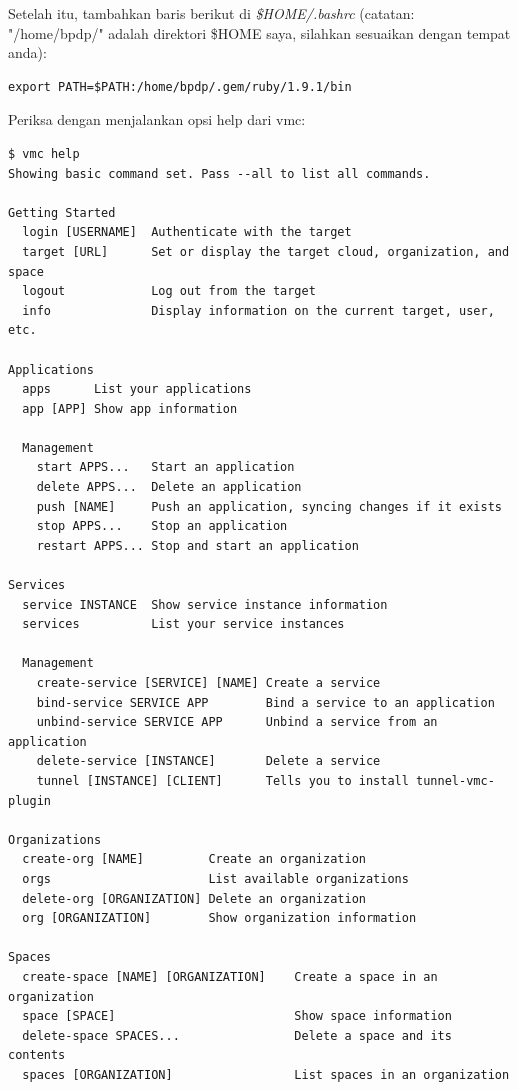 Setelah itu, tambahkan baris berikut di \textit{\$HOME/.bashrc} (catatan: "/home/bpdp/" adalah direktori \$HOME saya, silahkan sesuaikan dengan tempat anda):

\lstset{language=bash,caption=Mengaktifkan direktori "bin" hasil instalasi gem}
\begin{lstlisting}
export PATH=$PATH:/home/bpdp/.gem/ruby/1.9.1/bin
\end{lstlisting}

Periksa dengan menjalankan opsi help dari vmc:

\lstset{language=bash,caption=Hasil opsi help dari vmc}
\begin{lstlisting}
$ vmc help 
Showing basic command set. Pass --all to list all commands.

Getting Started
  login [USERNAME]	Authenticate with the target
  target [URL]    	Set or display the target cloud, organization, and space
  logout          	Log out from the target
  info            	Display information on the current target, user, etc.

Applications
  apps     	List your applications
  app [APP]	Show app information

  Management
    start APPS...  	Start an application
    delete APPS... 	Delete an application
    push [NAME]    	Push an application, syncing changes if it exists
    stop APPS...   	Stop an application
    restart APPS...	Stop and start an application

Services
  service INSTANCE	Show service instance information
  services        	List your service instances

  Management
    create-service [SERVICE] [NAME]	Create a service
    bind-service SERVICE APP       	Bind a service to an application
    unbind-service SERVICE APP     	Unbind a service from an application
    delete-service [INSTANCE]      	Delete a service
    tunnel [INSTANCE] [CLIENT]     	Tells you to install tunnel-vmc-plugin

Organizations
  create-org [NAME]        	Create an organization
  orgs                     	List available organizations
  delete-org [ORGANIZATION]	Delete an organization
  org [ORGANIZATION]       	Show organization information

Spaces
  create-space [NAME] [ORGANIZATION]	Create a space in an organization
  space [SPACE]                     	Show space information
  delete-space SPACES...            	Delete a space and its contents
  spaces [ORGANIZATION]             	List spaces in an organization


\end{lstlisting}
